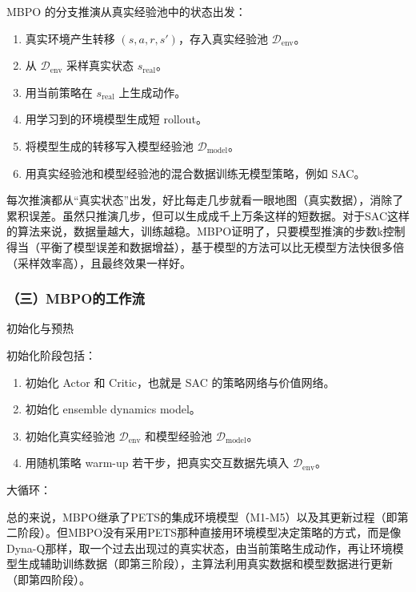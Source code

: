 MBPO 的分支推演从真实经验池中的状态出发：

\begin{enumerate}
\def\labelenumi{\arabic{enumi}.}
\tightlist
\item
  真实环境产生转移 \((s,a,r,s')\)，存入真实经验池 \(\mathcal D_{\mathrm{env}}\)。
\item
  从 \(\mathcal D_{\mathrm{env}}\) 采样真实状态 \(s_{\mathrm{real}}\)。
\item
  用当前策略在 \(s_{\mathrm{real}}\) 上生成动作。
\item
  用学习到的环境模型生成短 rollout。
\item
  将模型生成的转移写入模型经验池 \(\mathcal D_{\mathrm{model}}\)。
\item
  用真实经验池和模型经验池的混合数据训练无模型策略，例如 SAC。
\end{enumerate}

每次推演都从``真实状态''出发，好比每走几步就看一眼地图（真实数据），消除了累积误差。虽然只推演几步，但可以生成成千上万条这样的短数据。对于SAC这样的算法来说，数据量越大，训练越稳。MBPO证明了，只要模型推演的步数k控制得当（平衡了模型误差和数据增益），基于模型的方法可以比无模型方法快很多倍（采样效率高），且最终效果一样好。

\hypertarget{ux4e09mbpoux7684ux5de5ux4f5cux6d41}{%
\subsubsection{（三）MBPO的工作流}\label{ux4e09mbpoux7684ux5de5ux4f5cux6d41}}

初始化与预热

初始化阶段包括：

\begin{enumerate}
\def\labelenumi{\arabic{enumi}.}
\tightlist
\item
  初始化 Actor 和 Critic，也就是 SAC 的策略网络与价值网络。
\item
  初始化 ensemble dynamics model。
\item
  初始化真实经验池 \(\mathcal D_{\mathrm{env}}\) 和模型经验池 \(\mathcal D_{\mathrm{model}}\)。
\item
  用随机策略 warm-up 若干步，把真实交互数据先填入 \(\mathcal D_{\mathrm{env}}\)。
\end{enumerate}

大循环：

总的来说，MBPO继承了PETS的集成环境模型（M1-M5）以及其更新过程（即第二阶段）。但MBPO没有采用PETS那种直接用环境模型决定策略的方式，而是像Dyna-Q那样，取一个过去出现过的真实状态，由当前策略生成动作，再让环境模型生成辅助训练数据（即第三阶段），主算法利用真实数据和模型数据进行更新（即第四阶段）。

